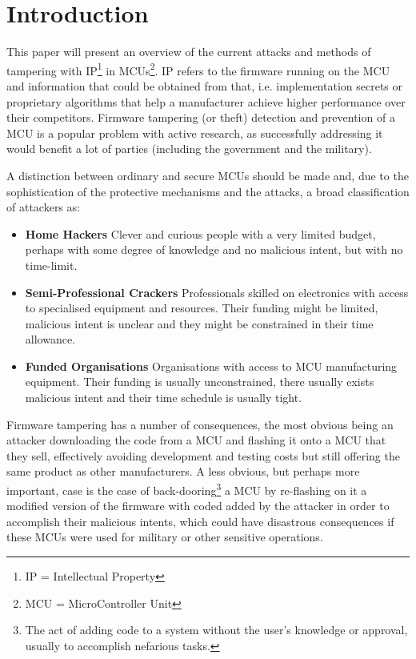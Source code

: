 \section{Introduction}
	This paper will present an overview of the current attacks and methods of tampering with IP\footnote{IP = Intellectual Property} in MCUs\footnote{MCU = MicroController Unit}. IP refers to the firmware running on the MCU and information that could be obtained from that, i.e. implementation secrets or proprietary algorithms that help a manufacturer achieve higher performance over their competitors. Firmware tampering (or theft) detection and prevention of a MCU is a popular problem with active research, as successfully addressing it would benefit a lot of parties (including the government and the military).
	
	A distinction between ordinary and secure MCUs should be made\citep{sergei:thesis} and, due to the sophistication of the protective mechanisms and the attacks, a broad classification of attackers as\cite{anderson:cautionary_note}:
		\begin{itemize}
			\item \textbf{Home Hackers} Clever and curious people with a very limited budget, perhaps with some degree of knowledge and no malicious intent, but with no time-limit.\\
			\item \textbf{Semi-Professional Crackers} Professionals skilled on electronics with access to specialised equipment and resources. Their funding might be limited, malicious intent is unclear and they might be constrained in their time allowance.\\
			\item \textbf{Funded Organisations} Organisations with access to MCU manufacturing equipment. Their funding is usually unconstrained, there usually exists malicious intent and their time schedule is usually tight.
		\end{itemize}
	
	Firmware tampering has a number of consequences, the most obvious being an attacker downloading the code from a MCU and flashing it onto a MCU that they sell, effectively avoiding development and testing costs but still offering the same product as other manufacturers\cite{tech:aes_bls}. A less obvious, but perhaps more important, case is the case of back-dooring\footnote{The act of adding code to a system without the user's knowledge or approval, usually to accomplish nefarious tasks.} a MCU by re-flashing on it a modified version of the firmware with coded added by the attacker in order to accomplish their malicious intents, which could have disastrous consequences if these MCUs were used for military or other sensitive operations. 

